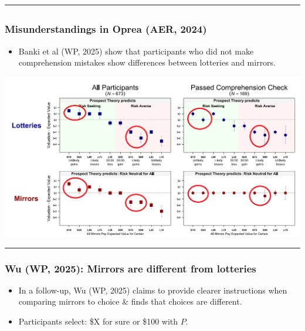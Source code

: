 \documentclass[
  letterpaper,
  DIV=11,
  numbers=noendperiod]{scrartcl}
\providecommand{\tightlist}{%
  \setlength{\itemsep}{0pt}\setlength{\parskip}{0pt}}\usepackage{longtable,booktabs,array}
\begin{document}
\begin{center}\rule{0.5\linewidth}{0.5pt}\end{center}

\subsection{}\label{section-4}

\subsubsection{Misunderstandings in Oprea (AER,
2024)}\label{misunderstandings-in-oprea-aer-2024-2}

\begin{itemize}
\tightlist
\item
  Banki et al (WP, 2025) show that participants who did not make
  comprehension mistakes show differences between lotteries and mirrors.
\end{itemize}

\includegraphics[width=0.7\linewidth,height=\textheight,keepaspectratio]{figures/SimplicityEquivalentsCommentRed.png}

\begin{center}\rule{0.5\linewidth}{0.5pt}\end{center}

\subsubsection{Wu (WP, 2025): Mirrors are different from
lotteries}\label{wu-wp-2025-mirrors-are-different-from-lotteries}

\begin{itemize}
\tightlist
\item
  In a follow-up, Wu (WP, 2025) claims to provide clearer instructions
  when comparing mirrors to choice \& finds that choices are different.
\item
  Participants select: \$X for sure or \$100 with \(P.\)
\end{itemize}
\end{document}
